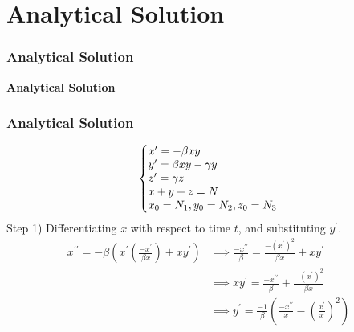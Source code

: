 \documentclass{beamer}
\makeatletter
\newenvironment{system}%
{\left\lbrace\begin{array}{@{}l@{}}}%
{\end{array}\right.}
\makeatother
\begin{document}
\section{Analytical Solution}
\begin{frame}\frametitle{Analytical Solution}
\begin{center}
    \textbf{Analytical Solution}
\end{center}
\end{frame}


\begin{frame}\frametitle{Analytical Solution}
\begin{equation*}
    \begin{system}
        x^{\prime} = -\beta x  y 
		\\
		y^{\prime} = \beta x  y - \gamma y 
		\\
		z^{\prime} = \gamma z 
		\\
		x + y + z = N
		\\
		x_0 = N_1, y_0 = N_2, z_0 = N_3
    \end{system}
\end{equation*}
Step 1) Differentiating $x$ with respect to time $t$, and substituting $y^{\prime}$.
\begin{equation*} 
	\begin{split}
		x^{\prime\prime} =
		-\beta\left( x^{\prime}\left(\frac{-x^{\prime}}{\beta x}\right) + x y^{\prime}\right)
		 & \implies \frac{-x^{\prime\prime}}{\beta} = \frac{-(x^{\prime})^{2}}{\beta x} + x y^{\prime}                             \\
		 & \implies x y^{\prime} = \frac{-x^{\prime\prime}}{\beta} + \frac{-(x^{\prime})^{2}}{\beta x}                             \\
		 & \implies y^{\prime} =  \frac{-1}{\beta}\left(\frac{-x^{\prime\prime}}{x} - \left(\frac{x^{\prime}}{x}\right)^{2}\right)
	\end{split}
\end{equation*}
\end{frame}
\end{document}
